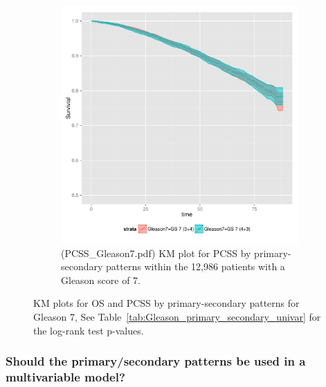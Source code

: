 \begin{figure}
\begin{subfigure}[t]{0.48\textwidth}
\begin{knitrout}
{\centering \includegraphics[width=\maxwidth]{figure/PCSS_Gleason7} 

}



\end{knitrout}

    \caption{(PCSS\_Gleason7.pdf) KM plot for PCSS by primary-secondary patterns
    within the
    12,986 patients with a Gleason score
    of 7.}
    \label{fig:primary_secondary_km_7pcss}
  \end{subfigure}
  \caption{KM plots for OS and PCSS by primary-secondary patterns for Gleason 7,
  See Table~\ref{tab:Gleason_primary_secondary_univar} for
  the log-rank test p-values.}
  \label{fig:primary_secondary_km}
\end{figure}





\subsubsection{Should the primary/secondary patterns be used in a multivariable
model?}  










